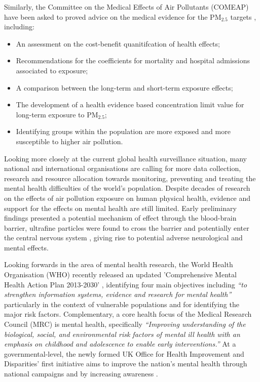 Similarly, the Committee on the Medical Effects of Air Pollutants (COMEAP) have been asked to proved advice on the medical evidence for the PM$_{2.5}$ targets \citep{CommitteeontheMedicalEffectsofAirPollutants2021AdviceTargets}, including:
\begin{itemize}
    \item An assessment on the cost-benefit quanitifcation of health effects;
    \item Recommendations for the coefficients for mortality and hospital admissions associated to exposure;
    \item A comparison between the long-term and short-term exposure effects;
    \item The development of a health evidence based concentration limit value for long-term exposure to PM$_{2.5}$;
    \item Identifying groups within the population are more exposed and more susceptible to higher air pollution. 
\end{itemize}

Looking more closely at the current global health surveillance situation, many national and international organisations are calling for more data collection, research and resource allocation towards monitoring, preventing and treating the mental health difficulties of the world's population. Despite decades of research on the effects of air pollution exposure on human physical health, evidence and support for the effects on mental health are still limited. Early preliminary findings presented a potential mechanism of effect through the blood-brain barrier, ultrafine particles were found to cross the barrier and potentially enter the central nervous system \citep{Oberdorster2002UltrafineBeyond}, giving rise to potential adverse neurological and mental effects.

Looking forwards in the area of mental health research, the World Health Organisation (WHO) recently released an updated 'Comprehensive Mental Health Action Plan 2013-2030' \citep{WorldHealthOrganisation2021Comprehensive2013-2020}, identifying four main objectives including \emph{``to strengthen information systems, evidence and research for mental health''} particularly in the context of vulnerable populations and for identifying the major risk factors. Complementary, a core health focus of the Medical Research Council (MRC) \citep{MedicalResearchCouncil2019Delivery2019} is mental health, specifically \emph{``Improving understanding of the biological, social, and environmental risk factors of mental ill health with an emphasis on childhood and adolescence to enable early interventions.''} At a governmental-level, the newly formed UK Office for Health Improvement and Disparities' first initiative aims to improve the nation's mental health through national campaigns and by increasing awareness \citep{OHID2021NewHealth}.

